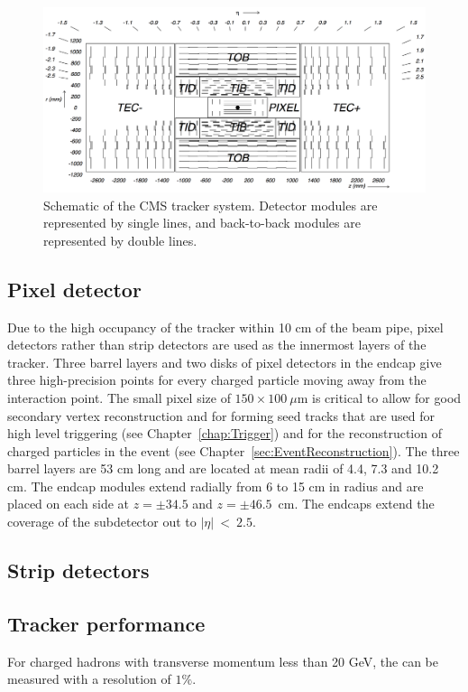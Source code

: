 \begin{figure}[h!]
	\centering
	\includegraphics[width=\linewidth]{Figures/Detector/tracker_layout.png}
       \caption{Schematic of the CMS tracker system. Detector modules are represented by single lines, and back-to-back modules are represented by double lines.}
   	\label{fig:TrackerLayout}
\end{figure}

\subsection{Pixel detector}
\label{sec:TrackerPixel}

Due to the high occupancy of the tracker within 10 cm of the beam pipe, pixel detectors rather than strip detectors are used as the innermost layers of the tracker. Three barrel layers and two disks of pixel detectors in the endcap give three high-precision points for every charged particle moving away from the interaction point. The small pixel size of $150\times100~\mu$m is critical to allow for good secondary vertex reconstruction and for forming seed tracks that are used for high level triggering (see Chapter~\ref{chap:Trigger}) and for the reconstruction of charged particles in the event (see Chapter~\ref{sec:EventReconstruction}). The three barrel layers are 53 cm long and are located at mean radii of 4.4, 7.3 and 10.2 cm. The endcap modules extend radially from 6 to 15 cm in radius and are placed on each side at $z=\pm34.5$ and $z=\pm46.5$~cm. The endcaps extend the coverage of the subdetector out to $|\eta|~<~ 2.5$. 


\subsection{Strip detectors}
\label{sec:TrackStrip}

\subsection{Tracker performance}
\label{sec:TrackPerformance}
For charged hadrons with transverse momentum \pt less than 20 GeV, the \pt can be measured with a resolution of $1\%$. 





